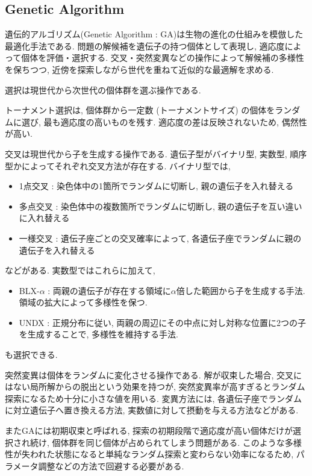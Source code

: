 \changeindent{0cm}
\subsection{Genetic Algorithm}
\changeindent{2cm}
\label{sec:02_ga}
遺伝的アルゴリズム(Genetic Algorithm : GA)は生物の進化の仕組みを模倣した最適化手法である.
問題の解候補を遺伝子の持つ個体として表現し, 適応度によって個体を評価・選択する.
交叉・突然変異などの操作によって解候補の多様性を保ちつつ,
近傍を探索しながら世代を重ねて近似的な最適解を求める.

選択は現世代から次世代の個体群を選ぶ操作である.

トーナメント選択は, 個体群から一定数 (トーナメントサイズ) の個体をランダムに選び, 最も適応度の高いものを残す.
適応度の差は反映されないため, 偶然性が高い.


交叉は現世代から子を生成する操作である.
遺伝子型がバイナリ型, 実数型, 順序型かによってそれぞれ交叉方法が存在する.
バイナリ型では,
\begin{itemize}
  \item 1点交叉 : 染色体中の1箇所でランダムに切断し, 親の遺伝子を入れ替える
  \item 多点交叉 : 染色体中の複数箇所でランダムに切断し, 親の遺伝子を互い違いに入れ替える
  \item 一様交叉 : 遺伝子座ごとの交叉確率によって, 各遺伝子座でランダムに親の遺伝子を入れ替える
\end{itemize}
などがある.
実数型ではこれらに加えて,
\begin{itemize}
  \item BLX-$\alpha$ : 両親の遺伝子が存在する領域に$\alpha$倍した範囲から子を生成する手法. 領域の拡大によって多様性を保つ.
  \item UNDX : 正規分布に従い, 両親の周辺にその中点に対し対称な位置に2つの子を生成することで, 多様性を維持する手法.
\end{itemize}
も選択できる.

突然変異は個体をランダムに変化させる操作である.
解が収束した場合, 交叉にはない局所解からの脱出という効果を持つが,
突然変異率が高すぎるとランダム探索になるため十分に小さな値を用いる.
変異方法には, 各遺伝子座でランダムに対立遺伝子へ置き換える方法, 実数値に対して摂動を与える方法などがある.

またGAには初期収束と呼ばれる, 探索の初期段階で適応度が高い個体だけが選択され続け,
個体群を同じ個体が占められてしまう問題がある.
このような多様性が失われた状態になると単純なランダム探索と変わらない効率になるため,
パラメータ調整などの方法で回避する必要がある.

